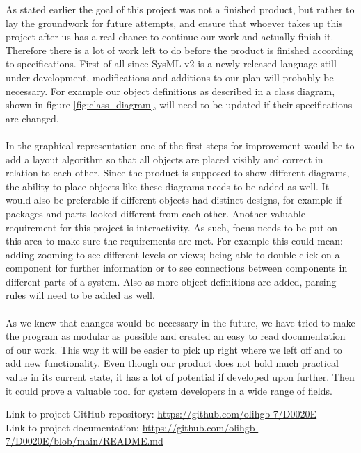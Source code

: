 \documentclass{article}
\begin{document}
As stated earlier the goal of this project was not a finished product, but rather to lay the groundwork for future attempts, and ensure that whoever takes up this project after us has a real chance to continue our work and actually finish it. Therefore there is a lot of work left to do before the product is finished according to specifications. First of all since SysML v2 is a newly released language still under development, modifications and additions to our plan will probably be necessary. For example our object definitions as described in a class diagram, shown in figure \ref{fig:class_diagram}, will need to be updated if their specifications are changed. 
\\\\
In the graphical representation one of the first steps for improvement would be to add a layout algorithm so that all objects are placed visibly and correct in relation to each other. Since the product is supposed to show different diagrams, the ability to place objects like these diagrams needs to be added as well. It would also be preferable if different objects had distinct designs, for example if packages and parts looked different from each other. Another valuable requirement for this project is interactivity. As such, focus needs to be put on this area to make sure the requirements are met. For example this could mean: adding zooming to see different levels or views; being able to double click on a component for further information or to see connections between components in different parts of a system. Also as more object definitions are added, parsing rules will need to be added as well. 
\\\\
As we knew that changes would be necessary in the future, we have tried to make the program as modular as possible and created an easy to read documentation of our work. This way it will be easier to pick up right where we left off and to add new functionality. Even though our product does not hold much practical value in its current state, it has a lot of potential if developed upon further. Then it could prove a valuable tool for system developers in a wide range of fields. 


\newpage
\printbibliography


\appendix
\appendixpage
\addappheadtotoc

Link to project GitHub repository: \url{https://github.com/olihgb-7/D0020E}                \\
Link to project documentation: \url{https://github.com/olihgb-7/D0020E/blob/main/README.md}
\end{document}
